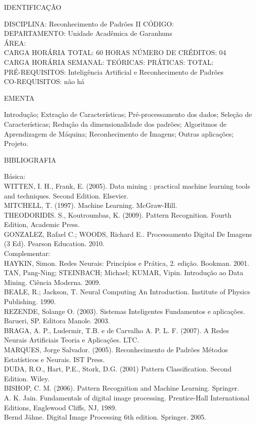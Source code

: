 \documentclass[
	12pt,				%
	openright,			%
  oneside,     %
	a4paper,			%
	english,			%
	french,				%
	spanish,			%
	brazil				%
	]{abntex2}
\begin{document}
\begin{apendicesenv}
\newpage IDENTIFICAÇÃO

DISCIPLINA: Reconhecimento de Padrões II CÓDIGO:\\ 
DEPARTAMENTO: Unidade Acadêmica de Garanhuns\\
ÁREA: \\
CARGA HORÁRIA TOTAL: 60 HORAS NÚMERO DE CRÉDITOS: 04\\
CARGA HORÁRIA SEMANAL: TEÓRICAS: PRÁTICAS: TOTAL: \\
PRÉ-REQUISITOS: Inteligência Artificial e Reconhecimento de Padrões\\
CO-REQUISITOS: não há

EMENTA 

Introdução; Extração de Características; Pré-processamento dos dados; Seleção de Características; Redução da dimensionalidade dos padrões; Algoritmos de Aprendizagem de Máquina; Reconhecimento de Imagens; Outras aplicações; Projeto.

BIBLIOGRAFIA 

Básica:\\
WITTEN, I. H., Frank, E. (2005). Data mining : practical machine
learning tools and techniques. Second Edition. Elsevier.\\
MITCHELL, T. (1997). Machine Learning. McGraw-Hill.\\
THEODORIDIS. S., Koutroumbas, K. (2009). Pattern Recognition. Fourth
Edition, Academic Press.\\
GONZALEZ, Rafael C.; WOODS, Richard E.. Processamento Digital De Imagens
(3 Ed). Pearson Education. 2010.\\
Complementar:\\
HAYKIN, Simon. Redes Neurais: Princípios e Prática, 2. edição. Bookman.
2001.\\
TAN, Pang-Ning; STEINBACH; Michael; KUMAR, Vipin. Introdução ao Data
Mining. Ciência Moderna. 2009.\\
BEALE, R.; Jackson, T. Neural Computing  An Introduction. Institute
of Physics Publishing. 1990.\\
REZENDE, Solange O. (2003). Sistemas Inteligentes  Fundamentos e
aplicações. Barueri, SP. Editora Manole. 2003.\\
BRAGA, A. P., Ludermir, T.B. e de Carvalho A. P. L. F. (2007). A Redes
Neurais Artificiais  Teoria e Aplicações. LTC.\\
MARQUES, Jorge Salvador. (2005). Reconhecimento de Padrões  Métodos
Estatísticos e Neurais. IST Press.\\
DUDA, R.O., Hart, P.E., Stork, D.G. (2001) Pattern Classification.
Second Edition. Wiley.\\
BISHOP, C. M. (2006). Pattern Recognition and Machine Learning.
Springer.\\
A. K. Jain. Fundamentals of digital image processing. Prentice-Hall
International Editions, Englewood Cliffs, NJ, 1989.\\
Bernd Jähne. Digital Image Processing 6th edition. Springer. 2005.


\end{apendicesenv}
\end{document}
